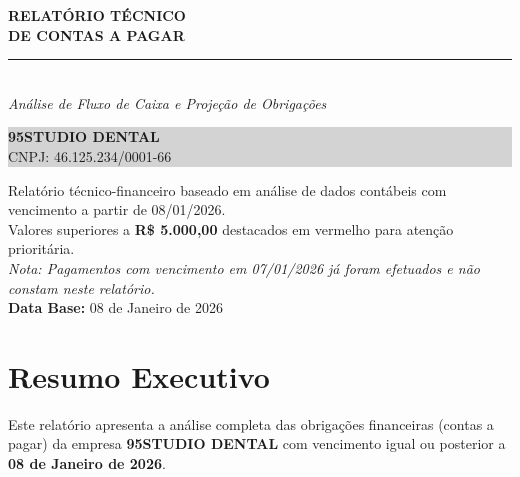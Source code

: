 \documentclass[12pt, a4paper]{article}
\begin{document}
\begin{titlepage}
    \centering
    \vspace*{3cm}
    {\Huge \textbf{\textcolor{primaryColor}{RELATÓRIO TÉCNICO}}} \\
    \vspace{0.5cm}
    {\Huge \textbf{\textcolor{primaryColor}{DE CONTAS A PAGAR}}} \\
    \vspace{2cm}
    \rule{10cm}{1.5pt} \\
    \vspace{0.5cm}
    {\Large \textit{Análise de Fluxo de Caixa e Projeção de Obrigações}} \\
    \vspace{1cm}
    \colorbox{lightGray}{%
        \parbox{0.9\textwidth}{%
            \centering
            \vspace{0.3cm}
            {\Large \textbf{95STUDIO DENTAL}} \\
            \vspace{0.3cm}
            {\large CNPJ: 46.125.234/0001-66} \\
            \vspace{0.3cm}
        }%
    }
    \vspace{4cm}

    \vfill
    {\small Relatório técnico-financeiro baseado em análise de dados contábeis com vencimento a partir de 08/01/2026.} \\
    \vspace{0.5cm}
    {\small Valores superiores a \textcolor{accentColor}{\textbf{R\$ 5.000,00}} destacados em vermelho para atenção prioritária.} \\
    \vspace{0.3cm}
    {\small \textit{Nota: Pagamentos com vencimento em 07/01/2026 já foram efetuados e não constam neste relatório.}} \\
    \vspace{1cm}
    \textbf{Data Base:} 08 de Janeiro de 2026
\end{titlepage}

\section{Resumo Executivo}

Este relatório apresenta a análise completa das obrigações financeiras (contas a pagar) da empresa \textbf{95STUDIO DENTAL} com vencimento igual ou posterior a \textbf{08 de Janeiro de 2026}.
\end{document}

